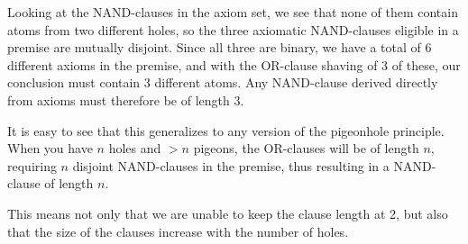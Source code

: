 Looking at the NAND-clauses in the axiom set, we see that none of them contain atoms from two different holes, so the three axiomatic NAND-clauses eligible in a premise are mutually disjoint.
Since all three are binary, we have a total of 6 different axioms in the premise, and with the OR-clause shaving of 3 of these, our conclusion must contain 3 different atoms.
Any NAND-clause derived directly from axioms must therefore be of length 3.
\begin{prooftree*}
\end{prooftree*}

It is easy to see that this generalizes to any version of the pigeonhole principle.
When you have $n$ holes and $>n$ pigeons, the OR-clauses will be of length $n$, requiring $n$ disjoint NAND-clauses in the premise, thus resulting in a NAND-clause of length $n$.

This means not only that we are unable to keep the clause length at 2, but also that the size of the clauses increase with the number of holes. 
